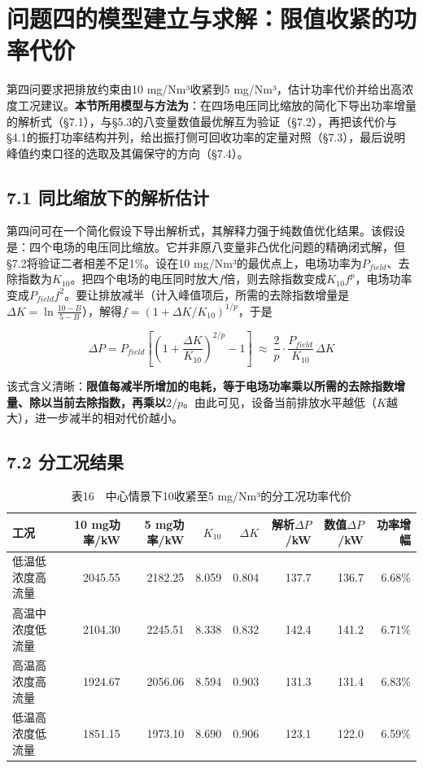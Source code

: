 \documentclass[UTF8,zihao=5,a4paper]{ctexart}
\begin{document}
\section{问题四的模型建立与求解：限值收紧的功率代价}

第四问要求把排放约束由10 mg/Nm³收紧到5 mg/Nm³，估计功率代价并给出高浓度工况建议。\textbf{本节所用模型与方法为}：在四场电压同比缩放的简化下导出功率增量的解析式（§7.1），与§5.3的八变量数值最优解互为验证（§7.2），再把该代价与§4.1的振打功率结构并列，给出振打侧可回收功率的定量对照（§7.3），最后说明峰值约束口径的选取及其偏保守的方向（§7.4）。

\subsection*{7.1 同比缩放下的解析估计}

第四问可在一个简化假设下导出解析式，其解释力强于纯数值优化结果。该假设是：四个电场的电压同比缩放。它并非原八变量非凸优化问题的精确闭式解，但§7.2将验证二者相差不足1\%。设在10 mg/Nm³的最优点上，电场功率为$P_{field}$、去除指数为$K_{10}$。把四个电场的电压同时放大$f$倍，则去除指数变成$K_{10}f^{p}$，电场功率变成$P_{field}f^{2}$。要让排放减半（计入峰值项后，所需的去除指数增量是$\Delta K=\ln\frac{10-B}{5-B}$），解得$f=(1+\Delta K/K_{10})^{1/p}$，于是

\begin{equation}
\Delta P=P_{field}\left[\left(1+\frac{\Delta K}{K_{10}}\right)^{2/p}-1\right]
\ \approx\ \frac{2}{p}\cdot\frac{P_{field}}{K_{10}}\,\Delta K 
\end{equation}

该式含义清晰：\textbf{限值每减半所增加的电耗，等于电场功率乘以所需的去除指数增量、除以当前去除指数，再乘以$2/p$}。由此可见，设备当前排放水平越低（$K$越大），进一步减半的相对代价越小。

\subsection*{7.2 分工况结果}


\begin{table}[htbp]
\centering
\caption*{\normalsize 表16　中心情景下10收紧至5 mg/Nm³的分工况功率代价}
\vspace{-2pt}
\begin{tabularx}{\textwidth}{>{\hsize=1.000\hsize\raggedright\arraybackslash}Xrrrrrrr}
\toprule
工况 & 10 mg功率/kW & 5 mg功率/kW & $K_{10}$ & $\Delta K$ & 解析$\Delta P$/kW & 数值$\Delta P$/kW & 功率增幅 \\
\midrule
1 低温低浓度高流量 & 2045.55 & 2182.25 & 8.059 & 0.804 & 137.7 & 136.7 & 6.68\% \\
2 高温中浓度低流量 & 2104.30 & 2245.51 & 8.338 & 0.832 & 142.4 & 141.2 & 6.71\% \\
3 高温高浓度高流量 & 1924.67 & 2056.06 & 8.594 & 0.903 & 131.3 & 131.4 & 6.83\% \\
4 低温高浓度低流量 & 1851.15 & 1973.10 & 8.690 & 0.906 & 123.1 & 122.0 & 6.59\% \\
\bottomrule
\end{tabularx}
\end{table}
\end{document}
